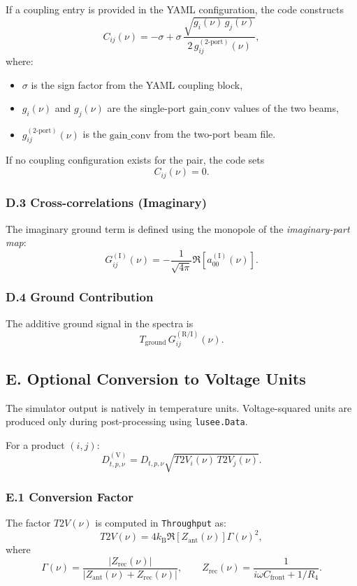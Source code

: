 \documentclass[11pt]{article}
\begin{document}
If a coupling entry is provided in the YAML configuration, the code constructs
\[
C_{ij}(\nu) = -\sigma + \sigma\,\frac{\sqrt{g_i(\nu)\,g_j(\nu)}}{2\,g_{ij}^{(2\text{-port})}(\nu)},
\]
where:
\begin{itemize}
\item $\sigma$ is the sign factor from the YAML coupling block,
\item $g_i(\nu)$ and $g_j(\nu)$ are the single-port $\mathrm{gain\_conv}$ values of the two beams,
\item $g_{ij}^{(2\text{-port})}(\nu)$ is the $\mathrm{gain\_conv}$ from the two-port beam file.
\end{itemize}

If no coupling configuration exists for the pair, the code sets
\[
C_{ij}(\nu)=0.
\]

\subsubsection*{D.3 Cross-correlations (Imaginary)}

The imaginary ground term is defined using the monopole of the \emph{imaginary-part map}:
\[
G^{(\mathrm{I})}_{ij}(\nu)
=
-
\frac{1}{\sqrt{4\pi}}
\Re\!\left[a^{(\mathrm{I})}_{00}(\nu)\right].
\]

\subsubsection*{D.4 Ground Contribution}

The additive ground signal in the spectra is
\[
T_{\mathrm{ground}}\,G^{(\mathrm{R/I})}_{ij}(\nu).
\]

\subsection*{E. Optional Conversion to Voltage Units}

The simulator output is natively in temperature units. Voltage-squared units are produced only during post-processing using \texttt{lusee.Data}.

For a product $(i,j)$:
\[
D^{(\mathrm{V})}_{t,p,\nu}
=
D_{t,p,\nu}
\sqrt{T2V_i(\nu)\,T2V_j(\nu)}.
\]

\subsubsection*{E.1 Conversion Factor}

The factor $T2V(\nu)$ is computed in \texttt{Throughput} as:
\[
T2V(\nu)
=
4k_{\mathrm{B}}\Re\!\left[Z_{\mathrm{ant}}(\nu)\right]\Gamma(\nu)^2,
\]
where
\[
\Gamma(\nu)
=
\frac{\lvert Z_{\mathrm{rec}}(\nu)\rvert}
{\lvert Z_{\mathrm{ant}}(\nu)+Z_{\mathrm{rec}}(\nu)\rvert},
\qquad
Z_{\mathrm{rec}}(\nu)
=
\frac{1}{i\omega C_{\mathrm{front}} + 1/R_4}.
\]
\end{document}
